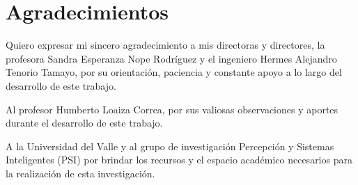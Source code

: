 \chapter*{Agradecimientos}
\thispagestyle{plain}

Quiero expresar mi sincero agradecimiento a mis directoras y directores,
la profesora Sandra Esperanza Nope Rodríguez y el ingeniero Hermes Alejandro Tenorio Tamayo,
por su orientación, paciencia y constante apoyo a lo largo del desarrollo de este trabajo.

Al profesor Humberto Loaiza Correa, por sus valiosas observaciones 
y aportes durante el desarrollo de este trabajo.

A la Universidad del Valle y al grupo de investigación
Percepción y Sistemas Inteligentes (PSI) por brindar los recursos y el espacio académico
necesarios para la realización de esta investigación.

\clearpage
